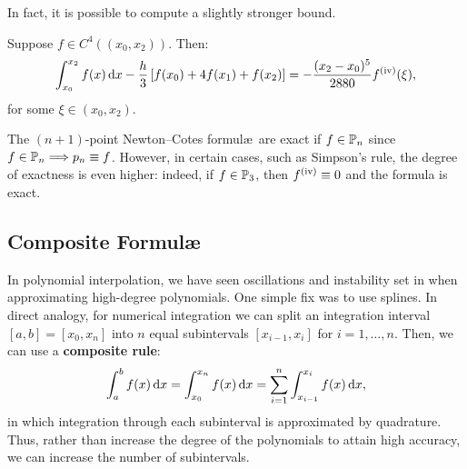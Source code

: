 In fact, it is possible to compute a slightly stronger bound.
\begin{theorem}
Suppose $f\in C^4((x_0,x_2))$. Then:
\[
\int_{x_0}^{x_2}f(x)\ud x - \dfrac{h}{3}\br[f(x_0)+4f(x_1)+f(x_2)] = -\dfrac{(x_2-x_0)^5}{2880}f^{({\rm iv})}(\xi),
\]
for some $\xi\in(x_0,x_2)$.
\end{theorem}

\begin{remark}
The $(n+1)$-point Newton--Cotes formul\ae~are exact if $f\in\P_n$ since $f\in\P_n\Longrightarrow p_n \equiv f$. However, in certain cases, such as Simpson's rule, the degree of exactness is even higher: indeed, if $f\in\P_3$, then $f^{({\rm iv})}\equiv0$ and the formula is exact.
\end{remark}

\subsection{Composite Formul\ae}

In polynomial interpolation, we have seen oscillations and instability set in when approximating high-degree polynomials. One simple fix was to use splines. In direct analogy, for numerical integration we can split an integration interval $[a,b] = [x_0,x_n]$ into $n$ equal subintervals $[x_{i-1},x_i]$ for $i=1,\ldots,n$. Then, we can use a {\bf composite rule}:
\[
\int_a^bf(x)\ud x = \int_{x_0}^{x_n}f(x)\ud x = \sum_{i=1}^n\int_{x_{i-1}}^{x_i}f(x)\ud x,
\]
in which integration through each subinterval is approximated by quadrature. Thus, rather than increase the degree of the polynomials to attain high accuracy, we can increase the number of subintervals.

